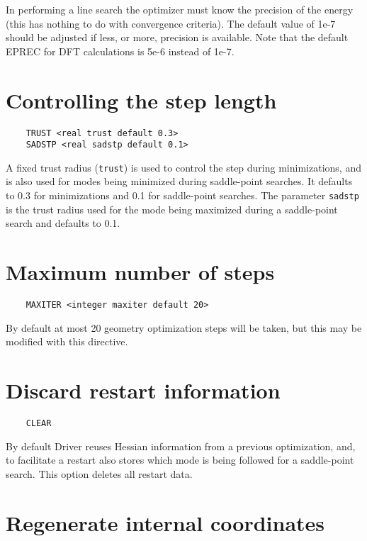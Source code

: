 In performing a line search the optimizer must know the
precision of the energy (this has nothing to
do with convergence criteria).  The default value
of 1e-7 should be adjusted if less, or more, precision
is available.  Note that the default EPREC for DFT
calculations is 5e-6 instead of 1e-7.

\section{Controlling the step length}

\begin{verbatim}
    TRUST <real trust default 0.3>
    SADSTP <real sadstp default 0.1>
\end{verbatim}

A fixed trust radius (\verb+trust+) is used to control the step during
minimizations, and is also used for modes being minimized during
saddle-point searches.  It defaults to 0.3 for minimizations and 0.1
for saddle-point searches.  The parameter \verb+sadstp+ is the trust
radius used for the mode being maximized during a saddle-point search
and defaults to 0.1.

\section{Maximum number of steps}

\begin{verbatim}
    MAXITER <integer maxiter default 20>
\end{verbatim}

By default at most 20 geometry optimization steps will be taken,
but this may be modified with this directive.

\section{Discard restart information}
\begin{verbatim}
    CLEAR
\end{verbatim}

By default Driver reuses Hessian information from a previous
optimization, and, to facilitate a restart also stores which mode is
being followed for a saddle-point search.  This option deletes all
restart data.

\section{Regenerate internal coordinates}

